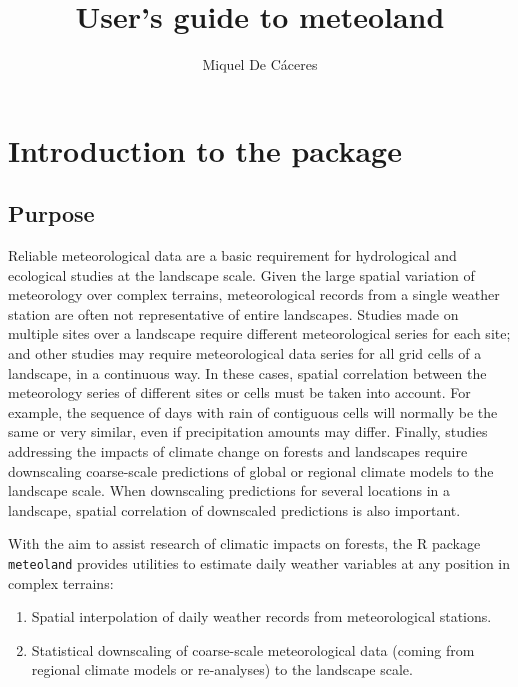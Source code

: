 \documentclass[11pt,a4paper]{article}
\title{User's guide to meteoland}
\author[1,2]{Miquel De Cáceres}
\affil[1]{Centre Tecnològic Forestal de Catalunya. Ctra. St. Llorenç de Morunys km 2, 25280, Solsona, Catalonia, Spain}
\affil[2]{CREAF, Cerdanyola del Vallès, 08193, Spain}
\begin{document}


\maketitle
\tableofcontents

\newpage

\section{Introduction to the package}
\subsection{Purpose}
Reliable meteorological data are a basic requirement for hydrological and ecological studies at the landscape scale. Given the large spatial variation of meteorology over complex terrains, meteorological records from a single weather station are often not representative of entire landscapes. Studies made on multiple sites over a landscape require different meteorological series for each site; and other studies may require meteorological data series for all grid cells of a landscape, in a continuous way. In these cases, spatial correlation between the meteorology series of different sites or cells must be taken into account. For example, the sequence of days with rain of contiguous cells will normally be the same or very similar, even if precipitation amounts may differ. Finally, studies addressing the impacts of climate change on forests and landscapes require downscaling coarse-scale predictions  of global or regional climate models to the landscape scale. When downscaling predictions for several locations in a landscape, spatial correlation of downscaled predictions is also important.

With the aim to assist research of climatic impacts on forests, the R package \texttt{meteoland} provides utilities to estimate daily weather variables at any position in complex terrains:
\begin{enumerate}
\item{Spatial interpolation of daily weather records from meteorological stations.}
\item{Statistical downscaling of coarse-scale meteorological data (coming from regional climate models or re-analyses) to the landscape scale.}
\end{enumerate}
\end{document}
